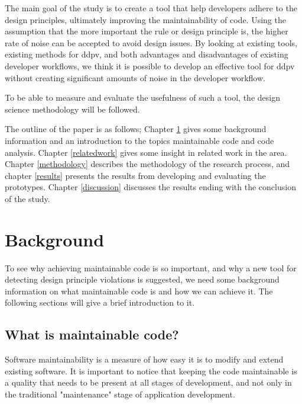 \documentclass{report}
\begin{document}
The main goal of the study is to create a tool that help developers adhere to the design principles, ultimately improving the maintainability of code. Using the assumption that the more important the rule or design principle is, the higher rate of noise can be accepted to avoid design issues. By looking at existing tools, existing methods for \gls{ddpv}, and both advantages and disadvantages of existing developer workflows, we think it is possible to develop an effective tool for \gls{ddpv} without creating significant amounts of noise in the developer workflow.

To be able to measure and evaluate the usefulness of such a tool, the design science methodology will be followed.


The outline of the paper is as follows; Chapter \ref{background} gives some background information and an introduction to the topics maintainable code and code analysis. Chapter \ref{relatedwork} gives some insight in related work in the area. Chapter \ref{methodology} describes the methodology of the research process, and chapter \ref{results} presents the results from developing and evaluating the prototypes. Chapter \ref{discussion} discusses the results ending with the conclusion of the study.  

\chapter{Background}

\label{background}
To see why achieving maintainable code is so important, and why a new tool for detecting design principle violations is suggested, we need some background information on what maintainable code is and how we can achieve it. The following sections will give a brief introduction to it.

\section{What is maintainable code?}
Software maintainability is a measure of how easy it is to modify and extend existing software. It is important to notice that keeping the code maintainable is a quality that needs to be present at all stages of development, and not only in the traditional "maintenance" stage of application development.  
\end{document}
